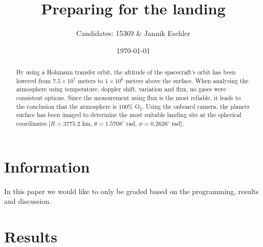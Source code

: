 \documentclass[reprint,english,notitlepage]{revtex4-2}
\begin{document}
\title{Preparing for the landing}
\author{Candidates: 15369 \& Jannik Eschler}
\date{\today}

\begin{abstract}
    By using a Hohmann transfer orbit, the altitude of the spacecraft's orbit has been lowered from $7.5 \times 10^7$ meters to $1 \times 10^6$ meters above the surface.
    When analysing the atmosphere using temperature, doppler shift, variation and flux, no gases were consistent options.
    Since the measurement using flux is the most reliable, it leads to the conclusion that the atmosphere is $100\%$ O$_2$.
    Using the onboard camera, the planets surface has been imaged to determine the most suitable landing site at the spherical coordinates [$R = 3775.2$ km, $\theta = 1.5708^{\circ}$ rad, $\phi = 0.2626^{\circ}$ rad].
\end{abstract}

\maketitle
\onecolumngrid
\section{Information} \label{sec:info}
\begin{center}
    In this paper we would like to only be graded based on the programming, results and discussion.
\end{center}

\section{Results} \label{sec: results}
\end{document}
